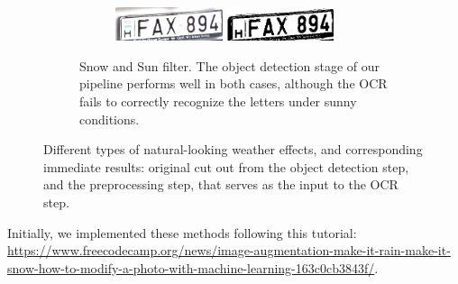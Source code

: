 \begin{figure}
\begin{subfigure}[b]{\textwidth}
\begin{subfigure}[b]{.4\textwidth}
            \includegraphics[width=0.45\textwidth]{figures/weather-results/cutouts/sunny_0.jpg}
            \includegraphics[width=0.45\textwidth]{figures/weather-results/cleared/sunny_0.jpg}
        \end{subfigure}
        \caption{Snow and Sun filter. The object detection stage of our pipeline
            performs well in both cases, although the OCR fails to correctly
            recognize the letters under sunny conditions.}
        \label{fig:weather-snow-sun}
    \end{subfigure}
    \caption{Different types of natural-looking weather effects, and
    corresponding immediate results: original cut out from the object detection
    step, and the preprocessing step, that serves as the input to the OCR step.}
    \label{fig:weather-effects}
\end{figure}

Initially, we implemented these methods following this tutorial: 
\url{https://www.freecodecamp.org/news/image-augmentation-make-it-rain-make-it-snow-how-to-modify-a-photo-with-machine-learning-163c0cb3843f/}.

